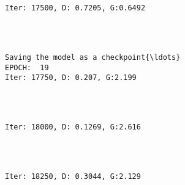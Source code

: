 \documentclass[11pt]{article}
\begin{document}
    \begin{center}
    \end{center}
    { \hspace*{\fill} \\}
    
    \begin{Verbatim}[commandchars=\\\{\}]

Iter: 17500, D: 0.7205, G:0.6492
    \end{Verbatim}

    \begin{center}
    \end{center}
    { \hspace*{\fill} \\}
    
    \begin{Verbatim}[commandchars=\\\{\}]

Saving the model as a checkpoint{\ldots}
EPOCH:  19
Iter: 17750, D: 0.207, G:2.199
    \end{Verbatim}

    \begin{center}
    \end{center}
    { \hspace*{\fill} \\}
    
    \begin{Verbatim}[commandchars=\\\{\}]

Iter: 18000, D: 0.1269, G:2.616
    \end{Verbatim}

    \begin{center}
    \end{center}
    { \hspace*{\fill} \\}
    
    \begin{Verbatim}[commandchars=\\\{\}]

Iter: 18250, D: 0.3044, G:2.129
    \end{Verbatim}
\end{document}
